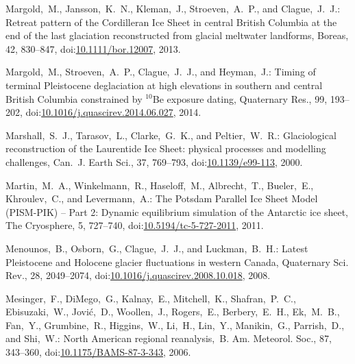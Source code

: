 \documentclass[tc, manuscript]{copernicus}
\begin{document}
\begin{thebibliography}{114}
Margold,~M., Jansson,~K.~N., Kleman,~J., Stroeven,~A.~P., and Clague,~J.~J.: Retreat pattern of the Cordilleran Ice Sheet in central British Columbia at the end of the last glaciation reconstructed from glacial meltwater landforms, Boreas, 42, 830--847,
doi:\href{http://dx.doi.org/10.1111/bor.12007}{10.1111/bor.12007}, 2013{}.


Margold,~M., Stroeven,~A.~P., Clague,~J.~J., and Heyman,~J.: Timing of terminal Pleistocene deglaciation at high elevations in southern and central British Columbia constrained by $^{10}$Be exposure dating, Quaternary Res., 99, 193--202,
doi:\href{http://dx.doi.org/10.1016/j.quascirev.2014.06.027}{10.1016/j.quascirev.2014.06.027}, 2014.


Marshall,~S.~J., Tarasov,~L., Clarke,~G.~K., and Peltier,~W.~R.: Glaciological reconstruction of the Laurentide Ice Sheet: physical processes and modelling challenges, Can.~J. Earth Sci., 37, 769--793,
doi:\href{http://dx.doi.org/10.1139/e99-113}{10.1139/e99-113}, 2000.


 Martin,~M.~A., Winkelmann,~R., Haseloff,~M., Albrecht,~T., Bueler,~E., Khroulev,~C., and Levermann,~A.: The Potsdam Parallel Ice Sheet Model (PISM-PIK) -- Part 2: Dynamic equilibrium simulation of the Antarctic ice sheet, The Cryosphere, 5, 727--740,
doi:\href{http://dx.doi.org/10.5194/tc-5-727-2011}{10.5194/tc-5-727-2011}, 2011.


Menounos,~B., Osborn,~G., Clague,~J.~J., and Luckman,~B.~H.: Latest Pleistocene and Holocene glacier fluctuations in western Canada, Quaternary Sci. Rev., 28, 2049--2074,
doi:\href{http://dx.doi.org/10.1016/j.quascirev.2008.10.018}{10.1016/j.quascirev.2008.10.018}, 2008.


Mesinger,~F., DiMego,~G., Kalnay,~E., Mitchell,~K., Shafran,~P.~C., Ebisuzaki,~W., Jovi\'{c},~D., Woollen,~J., Rogers,~E., Berbery,~E.~H., Ek,~M.~B., Fan,~Y., Grumbine,~R., Higgins,~W., Li,~H., Lin,~Y., Manikin,~G., Parrish,~D., and Shi,~W.: North American regional reanalysis,~B. Am. Meteorol. Soc., 87, 343--360,
doi:\href{http://dx.doi.org/10.1175/BAMS-87-3-343}{10.1175/BAMS-87-3-343}, 2006.



\end{thebibliography}
\end{document}
